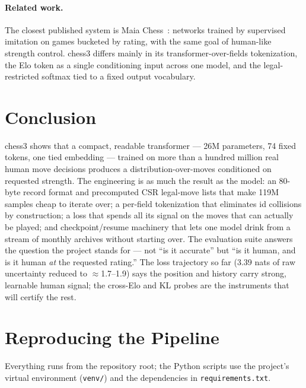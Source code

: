\documentclass[10pt,a4paper]{article}
\newcommand{\code}[1]{\texttt{#1}}
\begin{document}
\paragraph{Related work.} The closest published system is Maia
Chess~\cite{maia}: networks trained by supervised imitation on games
bucketed by rating, with the same goal of human-like strength control.
chess3 differs mainly in its transformer-over-fields tokenization, the
Elo token as a single conditioning input across one model, and the
legal-restricted softmax tied to a fixed output vocabulary.

\section{Conclusion}\label{sec:conclusion}

chess3 shows that a compact, readable transformer --- 26M parameters,
74 fixed tokens, one tied embedding --- trained on more than a hundred
million real human move decisions produces a
distribution-over-moves conditioned on requested strength. The
engineering is as much the result as the model: an 80-byte record
format and precomputed CSR legal-move lists that make 119M samples
cheap to iterate over; a per-field tokenization that eliminates id
collisions by construction; a loss that spends all its signal on the
moves that can actually be played; and checkpoint/resume machinery that
lets one model drink from a stream of monthly archives without starting
over. The evaluation suite answers the question the project stands for
--- not ``is it accurate'' but ``is it human, and is it human \emph{at}
the requested rating.'' The loss trajectory so far (3.39 nats of raw
uncertainty reduced to $\approx$1.7--1.9) says the position and history
carry strong, learnable human signal; the cross-Elo and KL probes are
the instruments that will certify the rest.

\appendix
\section{Reproducing the Pipeline}\label{sec:repro}

Everything runs from the repository root; the Python scripts use the
project's virtual environment (\code{venv/}) and the dependencies in
\code{requirements.txt}.
\end{document}
